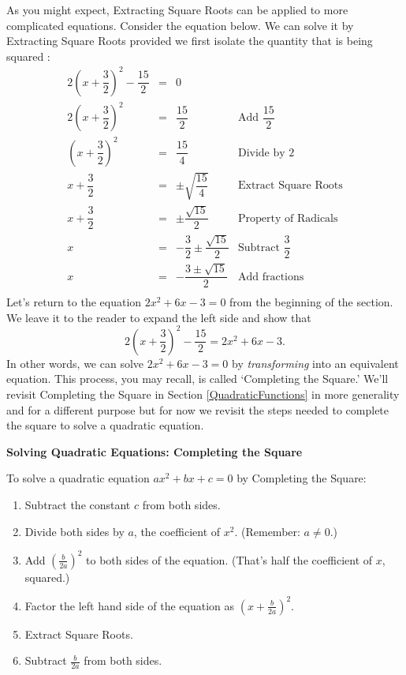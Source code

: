 \documentclass{ximera}
\begin{document}
As you might expect, Extracting Square Roots can be applied to more complicated equations.  Consider the equation below.  We can solve it by Extracting Square Roots provided we first isolate the quantity that is being squared :\[ \begin{array}{rclr}

2\left(x + \dfrac{3}{2}\right)^2 - \dfrac{15}{2} & = & 0 & \\ [8pt]
2\left(x + \dfrac{3}{2}\right)^2 & = & \dfrac{15}{2} & \text{Add $\dfrac{15}{2}$} \\
\left(x + \dfrac{3}{2}\right)^2 & = & \dfrac{15}{4} & \text{Divide by $2$} \\
x + \dfrac{3}{2} & = & \pm \sqrt{\dfrac{15}{4}} & \text{Extract Square Roots} \\ [8pt]
x + \dfrac{3}{2} & = & \pm \dfrac{\sqrt{15}}{2} & \text{Property of Radicals} \\ [5pt]
x & = & -\dfrac{3}{2} \pm \dfrac{\sqrt{15}}{2}  & \text{Subtract $\dfrac{3}{2}$} \\ [8pt]
x & = & -\dfrac{3 \pm \sqrt{15}}{2}  & \text{Add fractions} \\

\end{array} \] Let's return to the equation $2x^2 + 6x - 3 = 0$ from the beginning of the section.  We leave it to the reader to expand the left side and show that \[2\left(x + \dfrac{3}{2}\right)^2 - \dfrac{15}{2} =  2x^2 + 6x - 3. \] In other words, we can solve $2x^2 + 6x - 3 = 0$  by \textit{transforming} into an equivalent equation. This process, you may recall, is called `Completing the Square.'  We'll revisit Completing the Square in Section \ref{QuadraticFunctions} in more generality and for a different purpose but for now we revisit the steps needed to complete the square to solve a quadratic equation.

\medskip

\label{completesquareeqns}

\colorbox{ResultColor}{\bbm

\centerline{\textbf{Solving Quadratic Equations:  Completing the Square}}
\vspace{0.05in}
To solve a quadratic equation $ax^2 + bx + c = 0$ by Completing the Square:

\begin{enumerate}

\item  Subtract the constant $c$ from both sides.
\item  Divide both sides by $a$,  the coefficient of $x^2$.  (Remember:  $a \neq 0$.)
\item  Add $\left(\frac{b}{2a}\right)^2$ to both sides of the equation. (That's half the coefficient of $x$, squared.)
\item  Factor the left hand side of the equation as $\left(x + \frac{b}{2a}\right)^2$.
\item  Extract Square Roots.
\item  Subtract $\frac{b}{2a}$ from both sides.

\end{enumerate}

\ebm}
\end{document}
